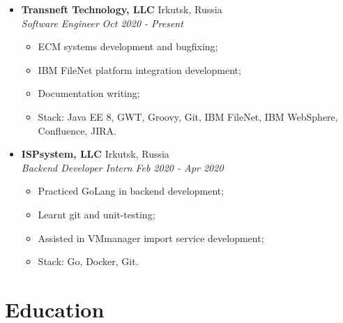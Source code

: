 \documentclass[10pt]{article}
\begin{document}
\begin{itemize}[noitemsep,topsep=0pt]
    \item \normalsize{\textbf{Transneft Technology, LLC}} \normalsize{\hfill Irkutsk, Russia 
    \\    \textit{ Software Engineer }
                                                                \hfill \textit{Oct 2020 - Present}}
            \begin{itemize}[itemsep=1pt,topsep=4pt] \normalsize
                \item {ECM systems development and bugfixing;}
                \item {IBM FileNet platform integration development;}
                \item {Documentation writing;}
                \item {Stack: Java EE 8, GWT, Groovy, Git, IBM FileNet, IBM WebSphere, Confluence, JIRA.}
            \end{itemize}
    \item \normalsize{\textbf{ISPsystem, LLC}} \normalsize{\hfill Irkutsk, Russia 
    \\    \textit{ Backend Developer Intern }
                                                                \hfill \textit{Feb 2020 - Apr 2020}}
            \begin{itemize}[itemsep=1pt,topsep=4pt] \normalsize
                \item {Practiced GoLang in backend development;}
                \item {Learnt git and unit-testing;}
                \item {Assisted in VMmanager import service development;}
                \item {Stack: Go, Docker, Git.}
            \end{itemize}
        \end{itemize}


\section{Education}
\paragraph{}
\end{document}
